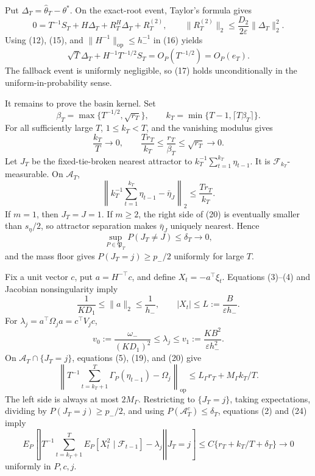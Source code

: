 Put \(\Delta_T=\widehat\theta_T-\theta^*\). On the exact-root event, Taylor's formula gives
\[
 0=T^{-1}S_T+H\Delta_T+R_T^H\Delta_T+R_T^{(2)},
 \qquad \|R_T^{(2)}\|_2\le\frac{D_2}{2\varepsilon}\|\Delta_T\|_2^2.
\tag{16}
\]
Using (12), (15), and \(\|H^{-1}\|_{\mathrm{op}}\le h_-^{-1}\) in (16) yields
\[
 \sqrt T\Delta_T+H^{-1}T^{-1/2}S_T
 =O_P(T^{-1/2})=O_P(e_T).
\tag{17}
\]
The fallback event is uniformly negligible, so (17) holds unconditionally in the uniform-in-probability sense.

It remains to prove the basin kernel. Set
\[
 \beta_T=\max\{T^{-1/2},\sqrt{r_T}\},\qquad
 k_T=\min\{T-1,\lceil T\beta_T\rceil\}.
\tag{18}
\]
For all sufficiently large \(T\), \(1\le k_T<T\), and the vanishing modulus gives
\[
 \frac{k_T}{T}\longrightarrow0,\qquad
 \frac{Tr_T}{k_T}\le\frac{r_T}{\beta_T}
 \le\sqrt{r_T}\longrightarrow0.
\tag{19}
\]
Let \(J_T\) be the fixed-tie-broken nearest attractor to \(k_T^{-1}\sum_{t=1}^{k_T}\eta_{t-1}\). It is \(\mathcal F_{k_T}\)-measurable. On \(\mathcal A_T\),
\[
 \left\|k_T^{-1}\sum_{t=1}^{k_T}\eta_{t-1}-\bar\eta_J\right\|_2
 \le\frac{Tr_T}{k_T}.
\tag{20}
\]
If \(m=1\), then \(J_T=J=1\). If \(m\ge2\), the right side of (20) is eventually smaller than \(s_\eta/2\), so attractor separation makes \(\bar\eta_J\) uniquely nearest. Hence
\[
 \sup_{P\in\mathfrak P_T}P(J_T\ne J)\le\delta_T\longrightarrow0,
\tag{21}
\]
and the mass floor gives \(P(J_T=j)\ge p_-/2\) uniformly for large \(T\).

Fix a unit vector \(c\), put \(a=H^{-\top}c\), and define \(X_t=-a^\top\xi_t\). Equations (3)--(4) and Jacobian nonsingularity imply
\[
 \frac1{KD_1}\le\|a\|_2\le\frac1{h_-},
 \qquad |X_t|\le L:=\frac{B}{\varepsilon h_-}.
\tag{22}
\]
For \(\lambda_j=a^\top\Omega_ja=c^\top V_jc\),
\[
 v_0:=\frac{\omega_-}{(KD_1)^2}\le\lambda_j
 \le v_1:=\frac{KB^2}{\varepsilon h_-^2}.
\tag{23}
\]
On \(\mathcal A_T\cap\{J_T=j\}\), equations (5), (19), and (20) give
\[
 \left\|T^{-1}\sum_{t=k_T+1}^T\Gamma_P(\eta_{t-1})-
 \Omega_j\right\|_{\mathrm{op}}
 \le L_\Gamma r_T+M_\Gamma k_T/T.
\tag{24}
\]
The left side is always at most \(2M_\Gamma\). Restricting to \(\{J_T=j\}\), taking expectations, dividing by \(P(J_T=j)\ge p_-/2\), and using \(P(\mathcal A_T^c)\le\delta_T\), equations (2) and (24) imply
\[
 E_P\!\left[\left.\left|T^{-1}\sum_{t=k_T+1}^T
 E_P[X_t^2\mid\mathcal F_{t-1}]-\lambda_j\right|
 \right|J_T=j\right]
 \le C\{r_T+k_T/T+\delta_T\}\longrightarrow0
\tag{25}
\]
uniformly in \(P,c,j\).

